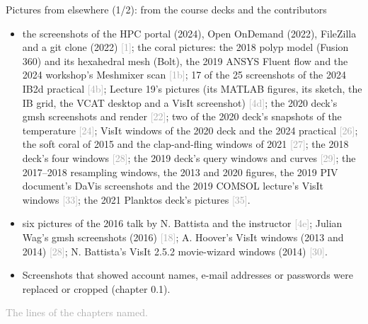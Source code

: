 \documentclass[aspectratio=169,11pt]{beamer}
\newcommand{\sourcecredit}[1]{\vfill\begin{flushright}\tiny\textcolor{DarkGray}{#1}\end{flushright}}
\newcommand{\ch}[1]{\textcolor{DarkGray}{[#1]}}
\begin{document}
\begin{frame}{Pictures from elsewhere (1/2): from the course decks and the contributors}
\label{fr:pics1}
\scriptsize
\begin{itemize}\setlength{\itemsep}{2pt}
  \item {} the screenshots of the HPC portal (2024), Open OnDemand (2022), FileZilla and a git clone (2022) \ch{1}; the coral pictures: the 2018 polyp model (Fusion 360) and its hexahedral mesh (Bolt), the 2019 ANSYS Fluent flow and the 2024 workshop's Meshmixer scan \ch{1b}; 17 of the 25 screenshots of the 2024 IB2d practical \ch{4b}; Lecture 19's pictures (its MATLAB figures, its sketch, the IB grid, the VCAT desktop and a VisIt screenshot) \ch{4d}; the 2020 deck's gmsh screenshots and render \ch{22}; two of the 2020 deck's snapshots of the temperature \ch{24}; VisIt windows of the 2020 deck and the 2024 practical \ch{26}; the soft coral of 2015 and the clap-and-fling windows of 2021 \ch{27}; the 2018 deck's four windows \ch{28}; the 2019 deck's query windows and curves \ch{29}; the 2017--2018 resampling windows, the 2013 and 2020 figures, the 2019 PIV document's DaVis screenshots and the 2019 COMSOL lecture's VisIt windows \ch{33}; the 2021 Planktos deck's pictures \ch{35}.
  \item {} six pictures of the 2016 talk by N. Battista and the instructor \ch{4e}; Julian Wag's gmsh screenshots (2016) \ch{18}; A. Hoover's VisIt windows (2013 and 2014) \ch{28}; N. Battista's VisIt 2.5.2 movie-wizard windows (2014) \ch{30}.
  \item Screenshots that showed account names, e-mail addresses or passwords were replaced or cropped (chapter 0.1).
\end{itemize}
\sourcecredit{The  lines of the chapters named.}
\end{frame}
\end{document}
